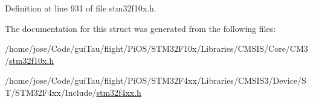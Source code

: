 Definition at line 931 of file stm32f10x.\-h.



The documentation for this struct was generated from the following files\-:\begin{DoxyCompactItemize}
\item 
/home/jose/\-Code/gui\-Tau/flight/\-Pi\-O\-S/\-S\-T\-M32\-F10x/\-Libraries/\-C\-M\-S\-I\-S/\-Core/\-C\-M3/\hyperlink{stm32f10x_8h}{stm32f10x.\-h}\item 
/home/jose/\-Code/gui\-Tau/flight/\-Pi\-O\-S/\-S\-T\-M32\-F4xx/\-Libraries/\-C\-M\-S\-I\-S3/\-Device/\-S\-T/\-S\-T\-M32\-F4xx/\-Include/\hyperlink{stm32f4xx_8h}{stm32f4xx.\-h}\end{DoxyCompactItemize}
